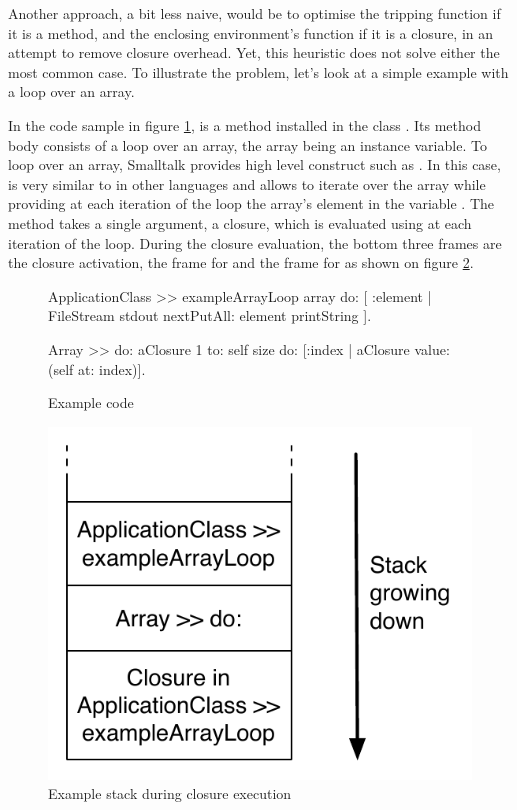 \documentclass[a4paper,12pt,twoside]{../includes/ThesisStyle}
\begin{document}
Another approach, a bit less naive, would be to optimise the tripping function if it is a method, and the enclosing environment's function if it is a closure, in an attempt to remove closure overhead. Yet, this heuristic does not solve either the most common case. To illustrate the problem, let's look at a simple example with a loop over an array.

In the code sample in figure \ref{fig:ExampleCode},  is a method installed in the class . Its method body consists of a loop over an array, the array being an instance variable. To loop over an array, Smalltalk provides high level construct such as . In this case,  is very similar to  in other languages and allows to iterate over the array while providing at each iteration of the loop the array's element in the variable . The  method takes a single argument, a closure, which is evaluated using  at each iteration of the loop. During the closure evaluation, the bottom three frames are the closure activation, the frame for  and the frame for  as shown on figure \ref{fig:ExampleLoopStack}.

\begin{figure}[h!]
    \begin{center}
        \begin{code}
        	ApplicationClass >> exampleArrayLoop
        	    array do: [ :element | FileStream stdout nextPutAll: element printString ].
        		
        	Array >> do: aClosure
        	    1 to: self size do: [:index | aClosure value: (self at: index)].
        \end{code}   
	\caption{Example code}
        \label{fig:ExampleCode}
    \end{center}
\end{figure}

\begin{figure}[h!]
    \begin{center}
        \includegraphics[width=0.45\linewidth]{ExampleLoopStack}
        \caption{Example stack during closure execution}
        \label{fig:ExampleLoopStack}
    \end{center}
\end{figure}
\end{document}
